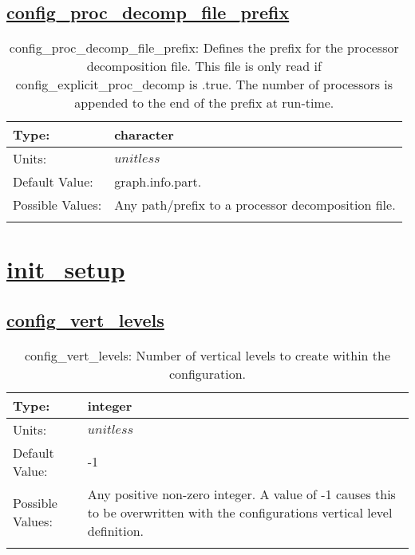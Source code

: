 \subsection[config\_proc\_decomp\_file\_prefix]{\hyperref[sec:nm_tab_decomposition]{config\_proc\_decomp\_file\_prefix}}
\label{subsec:nm_sec_config_proc_decomp_file_prefix}
\begin{center}
\begin{longtable}{| p{2.0in} || p{4.0in} |}
    \hline
    Type: & character \\
    \hline
    Units: & $unitless$ \\
    \hline
    Default Value: & graph.info.part. \\
    \hline
    Possible Values: & Any path/prefix to a processor decomposition file. \\
    \hline
    \caption{config\_proc\_decomp\_file\_prefix: Defines the prefix for the processor decomposition file. This file is only read if config\_explicit\_proc\_decomp is .true. The number of processors is appended to the end of the prefix at run-time.}
\end{longtable}
\end{center}
\section[init\_setup]{\hyperref[sec:nm_tab_init_setup]{init\_setup}}
\label{sec:nm_sec_init_setup}
\subsection[config\_vert\_levels]{\hyperref[sec:nm_tab_init_setup]{config\_vert\_levels}}
\label{subsec:nm_sec_config_vert_levels}
\begin{center}
\begin{longtable}{| p{2.0in} || p{4.0in} |}
    \hline
    Type: & integer \\
    \hline
    Units: & $unitless$ \\
    \hline
    Default Value: & -1 \\
    \hline
    Possible Values: & Any positive non-zero integer. A value of -1 causes this to be overwritten with the configurations vertical level definition. \\
    \hline
    \caption{config\_vert\_levels: Number of vertical levels to create within the configuration.}
\end{longtable}
\end{center}
